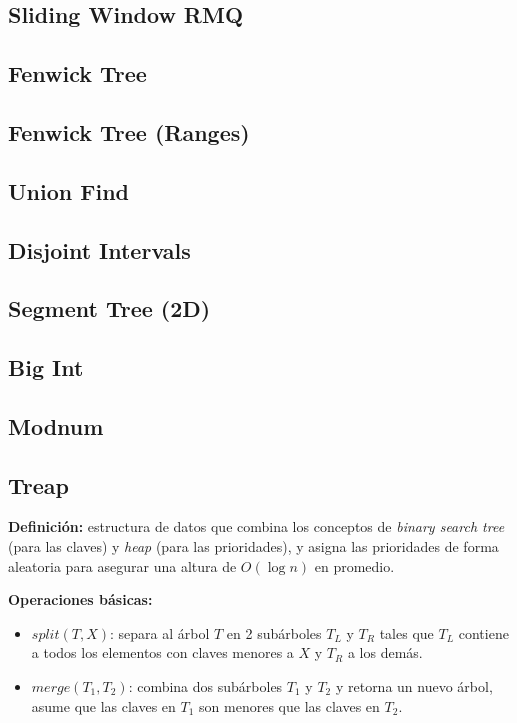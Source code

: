 \subsection{Sliding Window RMQ}
\subsection{Fenwick Tree}
\subsection{Fenwick Tree (Ranges)}
\subsection{Union Find}
\subsection{Disjoint Intervals}
\subsection{Segment Tree (2D)}
\subsection{Big Int}
\subsection{Modnum}
\subsection{Treap}
\textbf{Definición:} estructura de datos que combina los conceptos de \emph{binary search tree} (para las claves)
y \emph{heap} (para las prioridades), y asigna las prioridades de forma aleatoria para asegurar una altura de 
$O(\log{}n)$ en promedio.

\textbf{Operaciones básicas:}
\begin{itemize}
	\item $split(T, X)$: separa al árbol $T$ en 2 subárboles $T_L$ y $T_R$ tales que $T_L$ contiene a todos los 
	elementos con claves menores a $X$ y $T_R$ a los demás.
	\item $merge(T_1, T_2)$: combina dos subárboles $T_1$ y $T_2$ y retorna un nuevo árbol, 
	asume que las claves en $T_1$ son menores que las claves en $T_2$.
\end{itemize}

